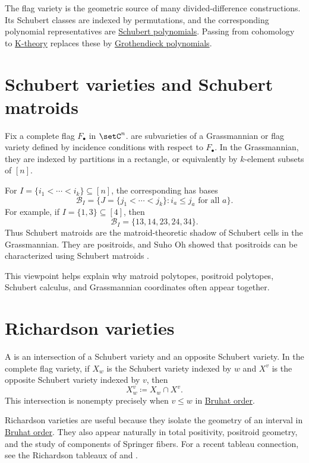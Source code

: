 The flag variety is the geometric source of many divided-difference
constructions.  Its Schubert classes are indexed by permutations, and the
corresponding polynomial representatives are
\hyperref[schubert]{Schubert polynomials}.  Passing from cohomology to
\hyperref[kTheory]{K-theory} replaces these by
\hyperref[grothendieck]{Grothendieck polynomials}.


\section[schubertVarietiesAndMatroids]{Schubert varieties and Schubert matroids}

Fix a complete flag $F_\bullet$ in $\setC^n$.
\label{schubertVarietyGeometryDefinition} are
subvarieties of a Grassmannian or flag variety defined by incidence conditions
with respect to $F_\bullet$.  In the Grassmannian, they are indexed by
partitions in a rectangle, or equivalently by $k$-element subsets of $[n]$.

For $I=\{i_1<\dotsb<i_k\}\subseteq[n]$, the corresponding
\label{schubertMatroidDefinition} has bases
\[
  \mathcal B_I
  =
  \{J=\{j_1<\dotsb<j_k\}: i_a\leq j_a\text{ for all }a\}.
\]
For example, if $I=\{1,3\}\subseteq[4]$, then
\[
  \mathcal B_I=\{13,14,23,24,34\}.
\]
Thus Schubert matroids are the matroid-theoretic shadow of Schubert cells in
the Grassmannian.  They are positroids, and Suho Oh showed that positroids
can be characterized using Schubert matroids \cite{Oh2011}.

This viewpoint helps explain why matroid polytopes, positroid polytopes,
Schubert calculus, and Grassmannian coordinates often appear together.


\section[richardsonVarieties]{Richardson varieties}

A \label{richardsonVarietyDefinition} is an
intersection of a Schubert variety and an opposite Schubert variety.  In the
complete flag variety, if $X_w$ is the Schubert variety indexed by $w$ and
$X^v$ is the opposite Schubert variety indexed by $v$, then
\[
  X_w^v\coloneqq X_w\cap X^v.
\]
This intersection is nonempty precisely when $v\leq w$ in
\hyperref[bruhatOrder]{Bruhat order}.

Richardson varieties are useful because they isolate the geometry of an
interval in \hyperref[bruhatOrder]{Bruhat order}.  They also appear naturally in total positivity,
positroid geometry, and the study of components of Springer fibers.  For a
recent tableau connection, see the Richardson tableaux of
 and  \cite{KarpPrecup2025x}.


